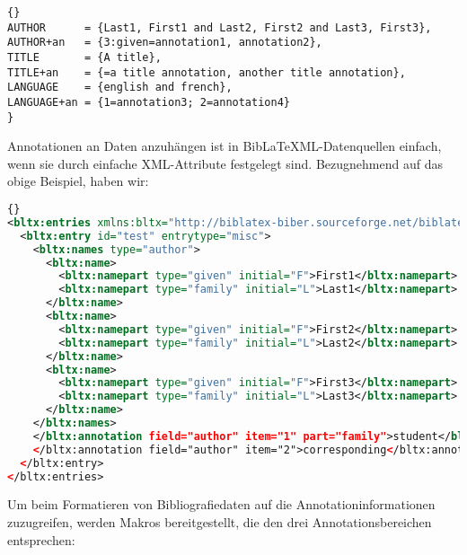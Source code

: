 \documentclass{ltxdockit}[2011/03/25]
\newcommand*{\biblatexml}{BibLaTeXML\xspace}
\begin{document}
\begin{lstlisting}[style=bibtex]{}
AUTHOR      = {Last1, First1 and Last2, First2 and Last3, First3},
AUTHOR+an   = {3:given=annotation1, annotation2},
TITLE       = {A title},
TITLE+an    = {=a title annotation, another title annotation},
LANGUAGE    = {english and french},
LANGUAGE+an = {1=annotation3; 2=annotation4}
}
\end{lstlisting}
%
Annotationen an Daten anzuhängen ist in \biblatexml-Datenquellen einfach, wenn sie durch einfache XML-Attribute festgelegt sind. Bezugnehmend auf das obige Beispiel, haben wir: 

\begin{lstlisting}[language=xml]{}
<bltx:entries xmlns:bltx="http://biblatex-biber.sourceforge.net/biblatexml">
  <bltx:entry id="test" entrytype="misc">
    <bltx:names type="author">
      <bltx:name>
        <bltx:namepart type="given" initial="F">First1</bltx:namepart>
        <bltx:namepart type="family" initial="L">Last1</bltx:namepart>
      </bltx:name>
      <bltx:name>
        <bltx:namepart type="given" initial="F">First2</bltx:namepart>
        <bltx:namepart type="family" initial="L">Last2</bltx:namepart>
      </bltx:name>
      <bltx:name>
        <bltx:namepart type="given" initial="F">First3</bltx:namepart>
        <bltx:namepart type="family" initial="L">Last3</bltx:namepart>
      </bltx:name>
    </bltx:names>
    </bltx:annotation field="author" item="1" part="family">student</bltx:annotation>
    </bltx:annotation field="author" item="2">corresponding</bltx:annotation>
  </bltx:entry>
</bltx:entries>
\end{lstlisting}
%
Um beim Formatieren von Bibliografiedaten auf die Annotationinformationen zuzugreifen, werden Makros bereitgestellt, die den drei Annotationsbereichen entsprechen:
\end{document}
